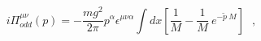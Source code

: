 \begin{equation}
i\Pi^{\mu\nu}_{odd}(p) =  -\frac {mg^2}{2 \pi } p^{\alpha}
\epsilon^{\mu \nu \alpha}\int dx [ \frac {1}{M} -  \frac {1}{M}~
e^{- \tilde p~M }] ~~~,
\end{equation}

